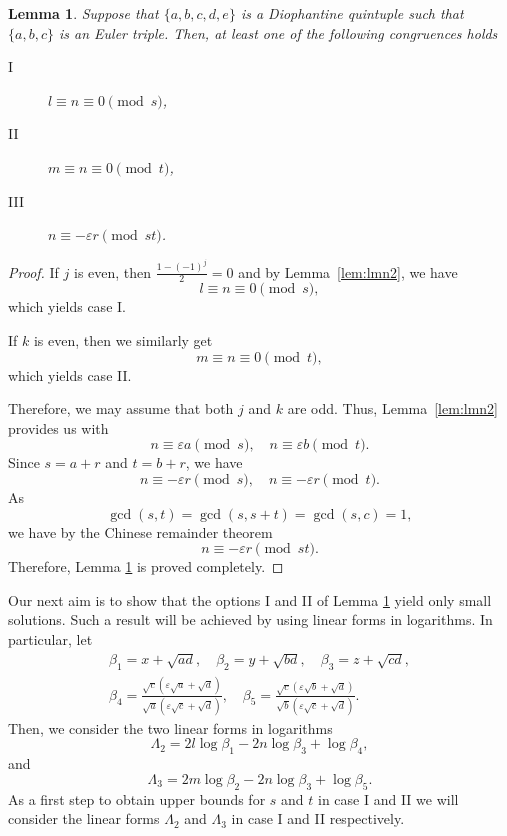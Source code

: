 \documentclass{amsart}
\newtheorem{lemma}{Lemma}
\theoremstyle{definition}
\begin{document}
\begin{lemma}\label{lem:lmnst}
 Suppose that $\{a,b,c,d,e\}$ is a Diophantine quintuple such that $\{a,b,c\}$ is an Euler triple. 
 Then, at least one of the following congruences holds 
\begin{description}
\item[I\phantom{II}] $l\equiv n\equiv 0\pmod{s}$,
\item[II\phantom{I}]  $m\equiv n\equiv 0 \pmod{t}$,
\item[III]  $n\equiv -\varepsilon r \pmod{st}$.
\end{description}
\end{lemma}

\begin{proof}
If $j$ is even, then $\frac{1-(-1)^j}{2}=0$ and by Lemma~\ref{lem:lmn2}, we have
$$
l\equiv n\equiv 0\pmod{s},
$$
which yields case I.

If $k$ is even, then we similarly get 
$$
m\equiv n\equiv 0 \pmod{t},
$$
which yields case II.

Therefore, we may assume that both $j$ and $k$ are odd. Thus, Lemma~\ref{lem:lmn2} provides us with 
$$
 n\equiv \varepsilon a \pmod{s}, \quad  n \equiv  \varepsilon b   \pmod{t}.
$$
Since $s=a+r$ and $t=b+r$, we have 
$$
 n\equiv -\varepsilon r \pmod{s},
\quad  n \equiv  -\varepsilon r   \pmod{t}.
$$
As
$$
\gcd(s,t)=\gcd(s,s+t)=\gcd(s,c)=1,
$$ 
we have by the Chinese remainder theorem 
$$
n\equiv -\varepsilon r \pmod{st}.
$$
Therefore, Lemma \ref{lem:lmnst} is proved completely.
\end{proof}

Our next aim is to show that the options I and II of Lemma \ref{lem:lmnst} yield only small solutions. Such a result will be
achieved by using linear forms in logarithms. In particular, let
\begin{gather*}
\beta_1= x+\sqrt{ad},\quad \beta_2 = y+ \sqrt{bd},\quad \beta_3 = z+\sqrt{cd},\\
\beta_4 = \frac{\sqrt{c}(\varepsilon\sqrt{a}+\sqrt{d})}{\sqrt{a}(\varepsilon\sqrt{c}+\sqrt{d})}, \quad \beta_5=\frac{\sqrt{c}(\varepsilon\sqrt{b}+\sqrt{d})}{\sqrt{b}(\varepsilon\sqrt{c}+\sqrt{d})}. 
\end{gather*}
Then, we consider the two linear forms in logarithms
$$
\Lambda_2=2l\log\beta_1 - 2n\log\beta_3+\log\beta_4,
$$
and
$$
\Lambda_3= 2m\log\beta_2- 2n\log\beta_3+\log\beta_5.
$$
As a first step to obtain upper bounds for $s$ and $t$ in case I and II we will consider the linear forms $\Lambda_2$ and $\Lambda_3$ in case I and II respectively.
\end{document}
